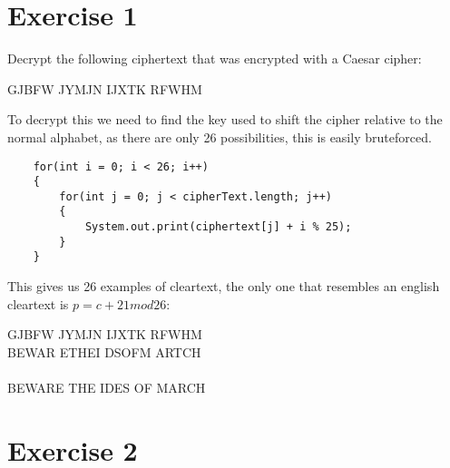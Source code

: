 \section{Exercise 1}
Decrypt the following ciphertext that was encrypted with a Caesar cipher:
\begin{center}
GJBFW JYMJN IJXTK RFWHM
\end{center}
To decrypt this we need to find the key used to shift the cipher relative to the
normal alphabet, as there are only 26 possibilities, this is easily
bruteforced.\\

\begin{lstlisting}
    for(int i = 0; i < 26; i++)
    {
    	for(int j = 0; j < cipherText.length; j++)
    	{
    		System.out.print(ciphertext[j] + i % 25);
    	}
    }
\end{lstlisting}

This gives us 26 examples of cleartext, the only one that resembles an english
cleartext is $p = c + 21 mod 26$:
\begin{center}
GJBFW JYMJN IJXTK RFWHM\\
BEWAR ETHEI DSOFM ARTCH\\
~\\
BEWARE THE IDES OF MARCH\\
\end{center}

\section{Exercise 2}

